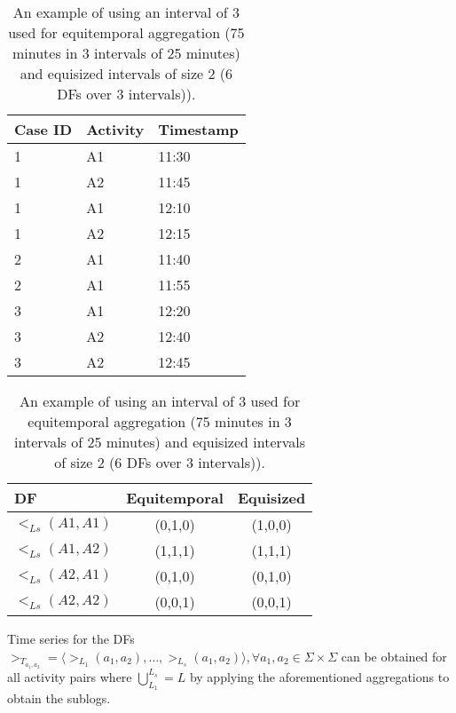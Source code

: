 \begin{table}[htbp]
   \begin{minipage}{.5\textwidth}
   	\centering
    \begin{tabular}{|l|l|l|}
    \toprule
    {Case ID} & Activity &Timestamp \\
    \midrule
    1     & A1    & 11:30 \\
    1     & A2    & 11:45 \\
    1     & A1    & 12:10 \\
    1     & A2    & 12:15 \\
    \midrule
    2     & A1    & 11:40 \\
    2     & A1    & 11:55 \\
    \midrule
    3     & A1    & 12:20 \\
    3     & A2    & 12:40 \\
    3     & A2    & 12:45 \\
    \bottomrule
    \end{tabular}
    \caption{Example event log with 3 traces and 2 activities.}
\label{tab:eventlog}
\end{minipage}
  \begin{minipage}{.5\textwidth}
  	\centering
    \begin{tabular}{|l|c|c|}
    \toprule
    DF    & Equitemporal  & Equisized \\
    \midrule
    $<_{Ls}(A1,A1)$ & (0,1,0) & (1,0,0) \\
    $<_{Ls}(A1,A2)$ & (1,1,1) & (1,1,1) \\
    $<_{Ls}(A2,A1)$ & (0,1,0) & (0,1,0) \\
    $<_{Ls}(A2,A2)$ & (0,0,1) & (0,0,1) \\
    \bottomrule
    \end{tabular}
  \caption{An example of using an interval of 3 used for equitemporal aggregation (75 minutes in 3 intervals of 25 minutes) and equisized intervals of size 2 (6 DFs over 3 intervals)).}
  \label{tab:aggregation}
 \end{minipage}%
\end{table}%

Time series for the DFs $>_{T_{a_1,a_2}}=\langle >_{L_1}(a_1,a_2),\dots,>_{L_s}(a_1,a_2)\rangle, \forall a_1,a_2\in \Sigma\times\Sigma$ can be obtained for all activity pairs where $\bigcup^{L_s}_{L_1}=L$ by applying the aforementioned aggregations to obtain the sublogs.


